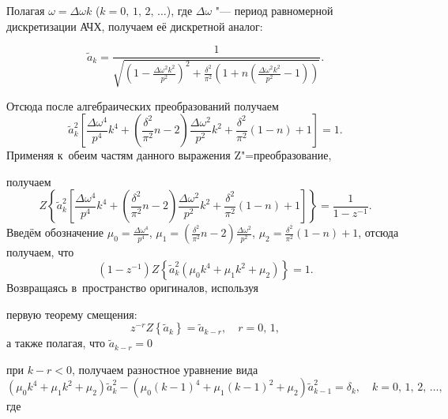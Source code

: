 Полагая $\omega = \Delta \omega k$ ($k = 0,\,1,\,2,\, \dots$), где $\Delta \omega 


$ "--- период равномерной дискретизации АЧХ, получаем её дискретной аналог: 


$$\tilde {a}_k = \frac{1}{\sqrt {\left( {1 - \frac{\Delta \omega ^2k^2}{p^2}} \right)^2 + \frac{\delta ^2}{\pi ^2}\left( {1 + n\left( {\frac{\Delta \omega ^2k^2}{p^2} - 1} \right)} \right)} }.$$ 


Отсюда после алгебраических преобразований получаем $$\tilde {a}_k ^2\left[ {\frac{\Delta \omega 


^4}{p^4}k^4 + \left( {\frac{\delta ^2}{\pi ^2}n - 2} \right)\frac{\Delta 


\omega ^2}{p^2}k^2 + \frac{\delta ^2}{\pi ^2}\left( {1 - n} \right) + 1} 


\right] = 1.$$ Применяя к~обеим частям данного выражения Z"=преобразование, 


получаем $$Z\left\{ {\tilde {a}_k ^2\left[ {\frac{\Delta \omega ^4}{p^4}k^4 + 


\left( {\frac{\delta ^2}{\pi ^2}n - 2} \right)\frac{\Delta \omega 


^2}{p^2}k^2 + \frac{\delta ^2}{\pi ^2}\left( {1 - n} \right) + 1} \right]} 


\right\} = \frac{1}{1 - z^{ - 1}}.$$ Введём обозначение $\mu _0 = 


\frac{\Delta \omega ^4}{p^4}$, $\mu _1 = \left( {\frac{\delta ^2}{\pi ^2}n - 


2} \right)\frac{\Delta \omega ^2}{p^2}$, $\mu _2 = \frac{\delta ^2}{\pi 


^2}\left( {1 - n} \right) + 1$, отсюда получаем, что $$\left( {1 - z^{ - 1}} 


\right)Z\left\{ {\tilde {a}_k^2 \left( {\mu _0 k^4 + \mu _1 k^2 + \mu _2 } 


\right)} \right\} = 1.$$ Возвращаясь в~пространство оригиналов, используя 


первую теорему смещения: $$z^{ - r}Z\left\{ {\tilde {a}_k } \right\} = \tilde 


{a}_{k - r},\quad  r = 0,\,1,$$ а также полагая, что $\tilde {a}_{k - r} = 0$ 


при $k - r < 0$, получаем разностное уравнение вида $$\left( {\mu _0 k^4 + \mu 


_1 k^2 + \mu _2 } \right)\tilde {a}_k^2 - \left( {\mu _0 \left( {k - 1} 


\right)^4 + \mu _1 \left( {k - 1} \right)^2 + \mu _2 } \right)\tilde {a}_{k 


- 1}^2 = \delta _k,\quad  k = 0,\,1,\,2,\,\dots ,$$ где 


